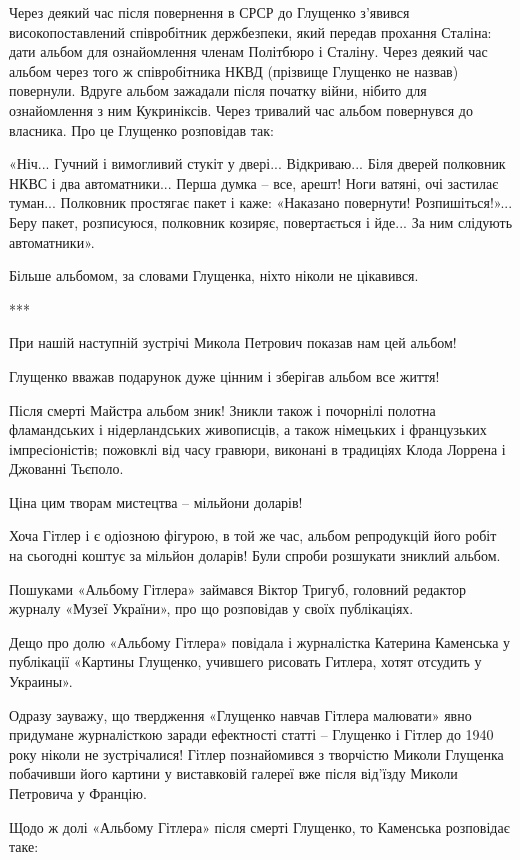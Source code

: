 Через деякий час після повернення в СРСР до Глущенко з'явився високопоставлений
співробітник держбезпеки, який передав прохання Сталіна: дати альбом для
ознайомлення членам Політбюро і Сталіну. Через деякий час альбом через того ж
співробітника НКВД (прізвище Глущенко не назвав) повернули. Вдруге альбом
зажадали після початку війни, нібито для ознайомлення з ним Кукриніксів. Через
тривалий час альбом повернувся до власника. Про це Глущенко розповідав так:

«Ніч... Гучний і вимогливий стукіт у двері... Відкриваю... Біля дверей
полковник НКВС і два автоматники... Перша думка – все, арешт! Ноги ватяні, очі
застилає туман... Полковник простягає пакет і каже: «Наказано повернути!
Розпишіться!»... Беру пакет, розписуюся, полковник козиряє, повертається і
йде... За ним слідують автоматники».

Більше альбомом, за словами Глущенка, ніхто ніколи не цікавився.

***

При нашій наступній зустрічі Микола Петрович показав нам цей альбом!

Глущенко вважав подарунок дуже цінним і зберігав альбом все життя!

Після смерті Майстра альбом зник! Зникли також і почорнілі полотна фламандських
і нідерландських живописців, а також німецьких і французьких імпресіоністів;
пожовклі від часу гравюри, виконані в традиціях Клода Лоррена і Джованні
Тьєполо. 

Ціна цим творам мистецтва – мільйони доларів!

Хоча Гітлер і є одіозною фігурою, в той же час, альбом репродукцій його робіт
на сьогодні коштує за мільйон доларів! Були спроби розшукати зниклий альбом. 

Пошуками «Альбому Гітлера» займався Віктор Тригуб, головний редактор журналу
«Музеї України», про що розповідав у своїх публікаціях.

Дещо про долю «Альбому Гітлера» повідала і журналістка Катерина Каменська у
публікації «Картины Глущенко, учившего рисовать Гитлера, хотят отсудить у
Украины».

Одразу зауважу, що твердження «Глущенко навчав Гітлера малювати» явно придумане
журналісткою заради ефектності статті – Глущенко і Гітлер до 1940 року ніколи
не зустрічалися! Гітлер познайомився з творчістю Миколи Глущенка побачивши його
картини у виставковій галереї вже після від’їзду Миколи Петровича у Францію.

Щодо ж долі «Альбому Гітлера» після смерті Глущенко, то Каменська розповідає
таке:

